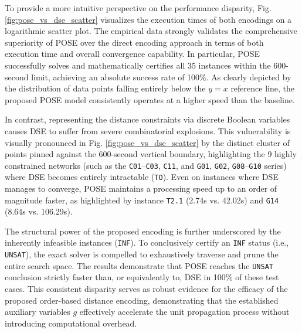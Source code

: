 \documentclass[letterpaper,journal]{IEEEtran}
\begin{document}
To provide a more intuitive perspective on the performance disparity, Fig. \ref{fig:pose_vs_dse_scatter} visualizes the execution times of both encodings on a logarithmic scatter plot. The empirical data strongly validates the comprehensive superiority of POSE over the direct encoding approach in terms of both execution time and overall convergence capability. In particular, POSE successfully solves and mathematically certifies all 35 instances within the 600-second limit, achieving an absolute success rate of 100\%. As clearly depicted by the distribution of data points falling entirely below the $y=x$ reference line, the proposed POSE model consistently operates at a higher speed than the baseline.

In contrast, representing the distance constraints via discrete Boolean variables causes DSE to suffer from severe combinatorial explosions. This vulnerability is visually pronounced in Fig. \ref{fig:pose_vs_dse_scatter} by the distinct cluster of points pinned against the 600-second vertical boundary, highlighting the 9 highly constrained networks (such as the \texttt{C01}--\texttt{C03}, \texttt{C11}, and \texttt{G01}, \texttt{G02}, \texttt{G08}--\texttt{G10} series) where DSE becomes entirely intractable (\texttt{TO}). Even on instances where DSE manages to converge, POSE maintains a processing speed up to an order of magnitude faster, as highlighted by instance \texttt{T2.1} (2.74s vs. 42.02s) and \texttt{G14} (8.64s vs. 106.29s).

The structural power of the proposed encoding is further underscored by the inherently infeasible instances (\texttt{INF}). To conclusively certify an \texttt{INF} status (i.e., \texttt{UNSAT}), the exact solver is compelled to exhaustively traverse and prune the entire search space. The results demonstrate that POSE reaches the \texttt{UNSAT} conclusion strictly faster than, or equivalently to, DSE in 100\% of these test cases. This consistent disparity serves as robust evidence for the efficacy of the proposed order-based distance encoding, demonstrating that the established auxiliary variables $g$ effectively accelerate the unit propagation process without introducing computational overhead.
\end{document}
